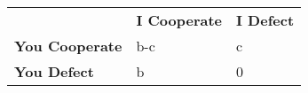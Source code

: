 \begin{table}[h]
\begin{tabular}{lll}
             & \textbf{I Cooperate} & \textbf{I Defect} \\
\textbf{You Cooperate} & b-c         & c        \\
\textbf{You Defect}    & b           & 0       
\end{tabular}
\end{table}